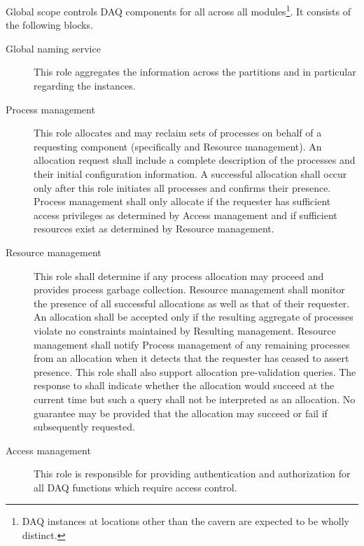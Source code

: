 Global scope controls DAQ components for all  across all  modules\footnote{DAQ instances at locations other than the  cavern are expected to be wholly distinct.}.  It consists of the following blocks.


\begin{description}
\item[Global naming service] This role aggregates the  information across the partitions and in particular regarding the  instances.

\item[Process management] This role allocates and may reclaim sets of processes on behalf of a requesting component (specifically  and Resource management). 
  An allocation request shall include a complete description of the processes and their initial configuration information. 
  A successful allocation shall occur only after this role initiates all processes and confirms their presence. 
  Process management shall only allocate if the requester has sufficient access privileges as determined by Access management and if sufficient resources exist as determined by Resource management.
  
\item[Resource management] This role shall determine if any process allocation may proceed and provides process garbage collection. 
  Resource management shall monitor the presence of all successful allocations as well as that of their requester.  
  An allocation shall be accepted only if the resulting aggregate of processes violate no constraints maintained by Resulting management.
  Resource management shall notify Process management of any remaining processes from an allocation when it detects that the requester has ceased to assert presence.
  This role shall also support allocation pre-validation queries. 
  The response to shall indicate whether the allocation would succeed at the current time but such a query shall not be interpreted as an allocation. 
  No guarantee may be provided that the allocation may succeed or fail if subsequently requested.

  
\item[Access management] This role is responsible for providing authentication and authorization for all DAQ functions which require access control.  

\end{description}


